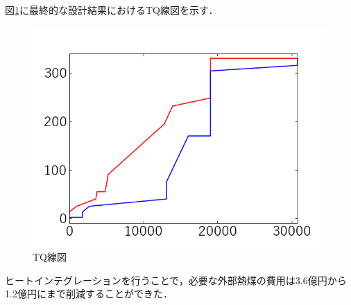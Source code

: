 \documentclass[a4j]{jsreport}
\begin{document}
\clearpage
図\ref{TQ線図}に最終的な設計結果におけるTQ線図を示す．
\begin{figure}[htbp]
  \centering
  \includegraphics[scale=0.7]{TQ.png}
  \caption{TQ線図}
  \label{TQ線図}
\end{figure}

ヒートインテグレーションを行うことで，必要な外部熱煤の費用は3.6億円から1.2億円にまで削減することができた．

\clearpage
\end{document}
